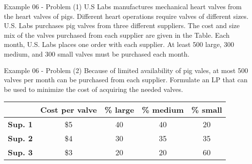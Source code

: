 \begin{frame}{Example 06 - Problem (1)}
U.S Labs manufactures mechanical heart valves from the heart valves of pigs. 
Different heart operations require valves of different sizes. U.S. Labs 
purchases pig valves from three different suppliers. The cost and size mix of 
the valves purchased from each supplier are given in the Table. Each month, U.S. 
Labs places one order with each supplier. At least 500 large, 300 medium, and 
300 small valves must be purchased each month.
\end{frame}

\begin{frame}{Example 06 - Problem (2)}
Because of limited availability 
of pig vales, at most 500 valves per month can be purchased from each supplier. 
Formulate an LP that can be used to minimize the cost of acquiring the needed 
valves.

\begin{center}
\begin{tabular}{|c||c|c|c|c|}
\hline
& \cellcolor{gray90}\textbf{Cost per valve} 
& \cellcolor{gray90}\textbf{\% large} 
& \cellcolor{gray90}\textbf{\% medium}
& \cellcolor{gray90}\textbf{\% small} \\
\hline
\hline \cellcolor{gray90}\textbf{Sup. 1} & \$5 & 40 & 40 & 20 \\
\hline \cellcolor{gray90}\textbf{Sup. 2} & \$4 & 30 & 35 & 35 \\
\hline \cellcolor{gray90}\textbf{Sup. 3} & \$3 & 20 & 20 & 60 \\
\hline 
\end{tabular}
\end{center}

\end{frame}
